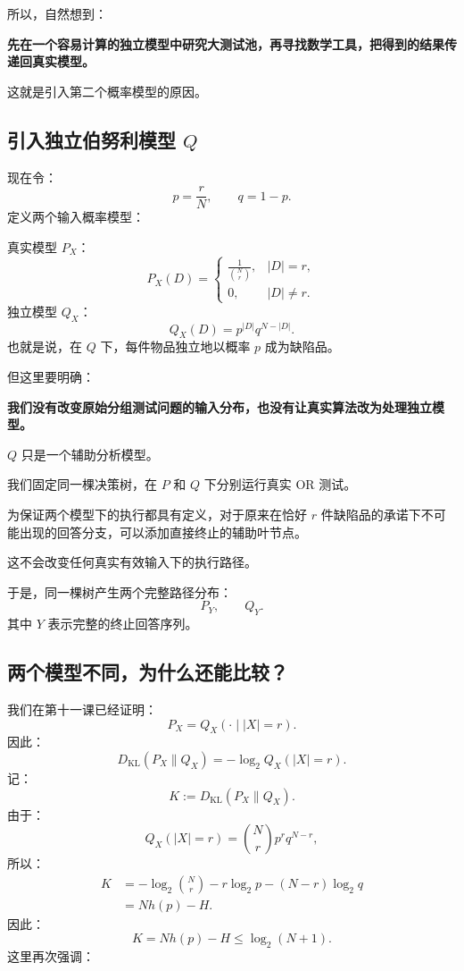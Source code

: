 \documentclass[UTF8,11pt]{ctexart}
\begin{document}
所以，自然想到：

\textbf{先在一个容易计算的独立模型中研究大测试池，再寻找数学工具，把得到的结果传递回真实模型。}

这就是引入第二个概率模型的原因。

\subsection{引入独立伯努利模型 $Q$}
现在令：
\[p=\frac rN,\qquad q=1-p.\]
定义两个输入概率模型：

真实模型 $P_X$：
\[
P_X(D)=\begin{cases}\displaystyle\frac1{\binom Nr},&|D|=r,\\0,&|D|\ne r.\end{cases}
\]
独立模型 $Q_X$：
\begin{equation}\boxed{Q_X(D)=p^{|D|}q^{N-|D|}.}\tag{19}\end{equation}
也就是说，在 $Q$ 下，每件物品独立地以概率 $p$ 成为缺陷品。

但这里要明确：

\textbf{我们没有改变原始分组测试问题的输入分布，也没有让真实算法改为处理独立模型。}

$Q$ 只是一个辅助分析模型。

我们固定同一棵决策树，在 $P$ 和 $Q$ 下分别运行真实 OR 测试。

为保证两个模型下的执行都具有定义，对于原来在恰好 $r$ 件缺陷品的承诺下不可能出现的回答分支，可以添加直接终止的辅助叶节点。

这不会改变任何真实有效输入下的执行路径。

于是，同一棵树产生两个完整路径分布：
\[P_Y,\qquad Q_Y.\]
其中 $Y$ 表示完整的终止回答序列。

\subsection{两个模型不同，为什么还能比较？}
我们在第十一课已经证明：
\[P_X=Q_X(\cdot\mid |X|=r).\]
因此：
\[D_{\mathrm{KL}}(P_X\|Q_X)=-\log_2Q_X(|X|=r).\]
记：
\begin{equation}\boxed{K:=D_{\mathrm{KL}}(P_X\|Q_X).}\tag{20}\end{equation}
由于：
\[Q_X(|X|=r)=\binom Nr p^rq^{N-r},\]
所以：
\[
\begin{aligned}
K&=-\log_2\binom Nr-r\log_2p-(N-r)\log_2q\\
&=Nh(p)-H.
\end{aligned}
\]
因此：
\begin{equation}\boxed{K=Nh(p)-H\le\log_2(N+1).}\tag{21}\end{equation}
这里再次强调：
\end{document}
